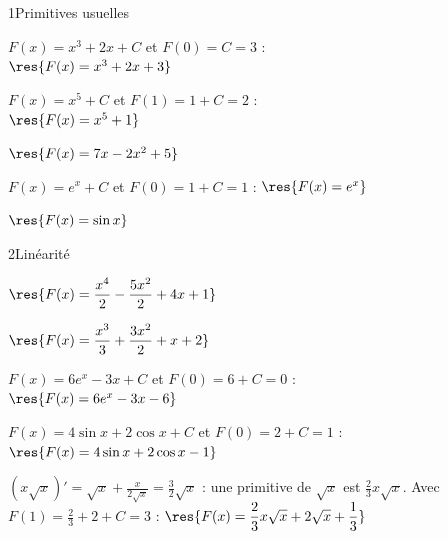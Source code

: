 

\begin{deuxcolonnes}

\begin{corrige}{1}{Primitives usuelles}
\begin{questions}
  \item $F(x)=x^{3}+2x+C$ et $F(0)=C=3$ :\\ $\res{F(x)=x^{3}+2x+3}$
  \item $F(x)=x^{5}+C$ et $F(1)=1+C=2$ :\\ $\res{F(x)=x^{5}+1}$
  \item $\res{F(x)=7x-2x^{2}+5}$
  \item $F(x)=e^{x}+C$ et $F(0)=1+C=1$ : $\res{F(x)=e^{x}}$
  \item $\res{F(x)=\sin x}$
\end{questions}
\end{corrige}

\begin{corrige}{2}{Linéarité}
\begin{questions}
  \item $\res{F(x)=\dfrac{x^{4}}{2}-\dfrac{5x^{2}}{2}+4x+1}$
  \item $\res{F(x)=\dfrac{x^{3}}{3}+\dfrac{3x^{2}}{2}+x+2}$
  \item $F(x)=6e^{x}-3x+C$ et $F(0)=6+C=0$ :\\ $\res{F(x)=6e^{x}-3x-6}$
  \item $F(x)=4\sin x+2\cos x+C$ et $F(0)=2+C=1$ :\\ $\res{F(x)=4\sin x+2\cos x-1}$
  \item $(x\sqrt x)'=\sqrt x+\frac{x}{2\sqrt x}=\frac32\sqrt x$ : une primitive de $\sqrt x$ est $\frac23x\sqrt x$. Avec $F(1)=\frac23+2+C=3$ :
    $\res{F(x)=\dfrac23x\sqrt x+2\sqrt x+\dfrac13}$
\end{questions}
\end{corrige}


\end{deuxcolonnes}

